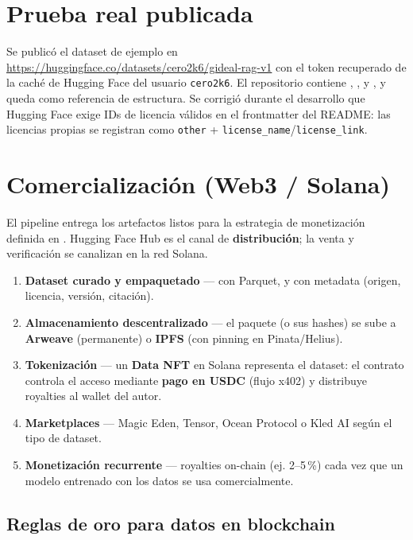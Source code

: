 \documentclass[12pt, a4paper]{article}
\begin{document}
\section{Prueba real publicada}

Se publicó el dataset de ejemplo  en
\url{https://huggingface.co/datasets/cero2k6/gideal-rag-v1} con el token
recuperado de la caché de Hugging Face del usuario \texttt{cero2k6}. El
repositorio contiene , , 
y , y queda como referencia de estructura. Se corrigió
durante el desarrollo que Hugging Face exige IDs de licencia válidos en el
frontmatter del README: las licencias propias se registran como
\texttt{other} + \texttt{license\_name}/\texttt{license\_link}.

\section{Comercialización (Web3 / Solana)}

El pipeline entrega los artefactos listos para la estrategia de monetización
definida en . Hugging Face Hub es el
canal de \textbf{distribución}; la venta y verificación se canalizan en la red
Solana.

\begin{enumerate}
    \item \textbf{Dataset curado y empaquetado} — con Parquet,  y
     con metadata (origen, licencia, versión, citación).
    \item \textbf{Almacenamiento descentralizado} — el paquete (o sus hashes) se
    sube a \textbf{Arweave} (permanente) o \textbf{IPFS} (con pinning en
    Pinata/Helius).
    \item \textbf{Tokenización} — un \textbf{Data NFT} en Solana representa el
    dataset: el contrato controla el acceso mediante \textbf{pago en USDC} (flujo
    x402) y distribuye royalties al wallet del autor.
    \item \textbf{Marketplaces} — Magic Eden, Tensor, Ocean Protocol o Kled AI
    según el tipo de dataset.
    \item \textbf{Monetización recurrente} — royalties on-chain (ej. 2--5\,\%)
    cada vez que un modelo entrenado con los datos se usa comercialmente.
\end{enumerate}

\subsection{Reglas de oro para datos en blockchain}
\end{document}
